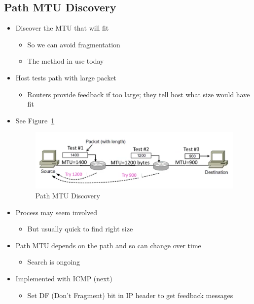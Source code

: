 \documentclass[12pt]{ctexart}   %
\begin{document}
	\subsection{Path MTU Discovery}
	\begin{itemize}
		\item Discover the MTU that will fit
		\begin{itemize}
			\item So we can avoid fragmentation
			\item The method in use today
		\end{itemize}
		
		\item Host tests path with large packet
		\begin{itemize}
			\item Routers provide feedback if too large; they tell host what size would have fit
		\end{itemize}
		\item See Figure~\ref{fig:4-7-4}
		
		\begin{figure}[h!] %
		\centering
		 \includegraphics[scale=0.7]{images/4-7-4}
		\caption{ Path MTU Discovery }
		 \label{fig:4-7-4}
		 \end{figure}
		 
		 \item Process may seem involved
		 \begin{itemize}
		 	\item But usually quick to find right size
		 \end{itemize}
		 
		 \item Path MTU depends on the path and so can change over time
		 \begin{itemize}
		 	\item Search is ongoing
		 \end{itemize}
		 
		 \item Implemented with ICMP (next)
		 \begin{itemize}
		 	\item Set DF (Don't Fragment) bit in IP header to get feedback messages
		 \end{itemize}
	\end{itemize}
	
\end{document}
